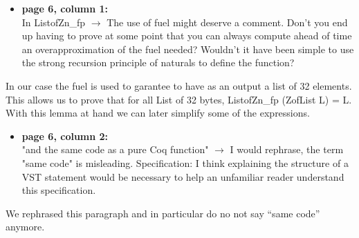 \begin{itemize}
  \item \textbf{page 6, column 1:}\\
        In ListofZn\_fp $\rightarrow$ The use of fuel might deserve a comment. Don't you end up having to prove at some point that you can always compute ahead of time an overapproximation of the fuel needed? Wouldn't it have been simple to use the strong recursion principle of naturals to define the function?
\end{itemize}
\begin{answer}
  In our case the fuel is used to garantee to have as an output a list of 32 elements. This allows us to prove that for all List of 32 bytes, ListofZn\_fp (ZofList L) = L. With this lemma at hand we can later simplify some of the expressions.
\end{answer}

\begin{itemize}
  \item \textbf{page 6, column 2:}\\
        "and the same code as a pure Coq function" $\rightarrow$ I would rephrase, the term "same code" is misleading.
        Specification: I think explaining the structure of a VST statement would be necessary to help an unfamiliar reader understand this specification.
\end{itemize}
\begin{answer}
  We rephrased this paragraph and in particular do no not say ``same code'' anymore.
\end{answer}

